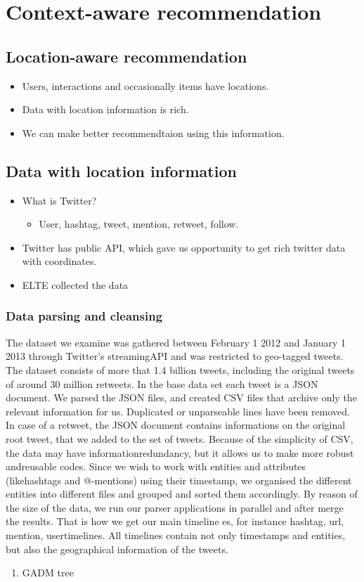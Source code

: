 \chapter{Context-aware recommendation}

\section{Location-aware recommendation}
\begin{itemize}
\item Users, interactions and occasionally items have locations.
\item Data with location information is rich.
\item We can make better recommendtaion using this information.
\end{itemize}

\section{Data with location information}
\begin{itemize}
\item What is Twitter?
  \begin{itemize}
    \item User, hashtag, tweet, mention, retweet, follow.
  \end{itemize}
\item Twitter has public API, which gave us opportunity to get rich twitter
  data with coordinates.
\item ELTE collected the data
\end{itemize}

\subsection{Data parsing and cleansing}
The dataset we examine was gathered between February 1 2012 and January 1 2013
through Twitter's streamingAPI and was restricted to geo-tagged tweets. The
dataset consists of more that 1.4 billion tweets, including the original
tweets of around 30 million retweets. In the base data set each tweet is a
JSON document. We parsed the JSON files, and created CSV files that archive
only the relevant information for us. Duplicated or unparseable lines have been
removed. In case of a retweet, the JSON document contains informations on the
original root tweet, that we added to the set of tweets. Because of the
simplicity of CSV, the data may have informationredundancy, but it allows us
to make more robust andreusable codes. Since we wish to work with entities and
attributes (likehashtags and @-mentions) using their timestamp, we organised
the different entities into different files and grouped and sorted them
accordingly. By reason of the size of the data, we run our parser applications
in parallel and after merge the results. That is how we get our main timeline
es, for instance hashtag, url, mention, usertimelines. All timelines contain
not only timestamps and entities, but also the geographical information of the
tweets.
\begin{enumerate}
\item GADM tree
\end{enumerate}
